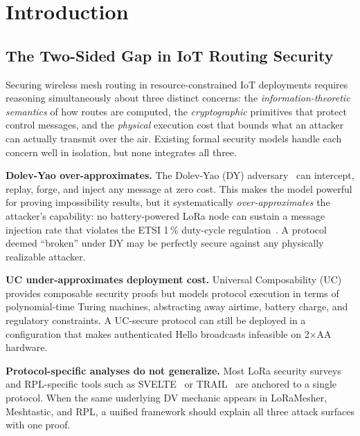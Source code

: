 \documentclass[journal,compsoc]{IEEEtran}
\theoremstyle{plain}
\theoremstyle{definition}
\theoremstyle{remark}
\begin{document}
\section{Introduction}
\label{sec:intro}

\subsection{The Two-Sided Gap in IoT Routing Security}

Securing wireless mesh routing in resource-constrained IoT deployments
requires reasoning simultaneously about three distinct concerns: the
\emph{information-theoretic semantics} of how routes are computed, the
\emph{cryptographic} primitives that protect control messages, and the
\emph{physical} execution cost that bounds what an attacker can actually
transmit over the air.  Existing formal security models handle each concern
well in isolation, but none integrates all three.

\textbf{Dolev-Yao over-approximates.}
The Dolev-Yao (DY) adversary~\cite{dolev1983security} can intercept, replay,
forge, and inject any message at zero cost.  This makes the model powerful
for proving impossibility results, but it systematically \emph{over-approximates}
the attacker's capability: no battery-powered LoRa node can sustain a
message injection rate that violates the ETSI 1\,\% duty-cycle
regulation~\cite{etsi300220}.  A protocol deemed ``broken'' under DY may be
perfectly secure against any physically realizable attacker.

\textbf{UC under-approximates deployment cost.}
Universal Composability (UC)~\cite{canetti2001universally} provides
composable security proofs but models protocol execution in terms of
polynomial-time Turing machines, abstracting away airtime, battery charge,
and regulatory constraints.  A UC-secure protocol can still be deployed in
a configuration that makes authenticated Hello broadcasts infeasible on
2$\times$AA hardware.

\textbf{Protocol-specific analyses do not generalize.}
Most LoRa security surveys~\cite{aras2017exploring,tomasin2017security} and
RPL-specific tools such as SVELTE~\cite{raza2013svelte} or
TRAIL~\cite{perazzo2017trail} are anchored to a single protocol.  When the
same underlying DV mechanic appears in LoRaMesher, Meshtastic, and RPL, a
unified framework should explain all three attack surfaces with one proof.
\end{document}
